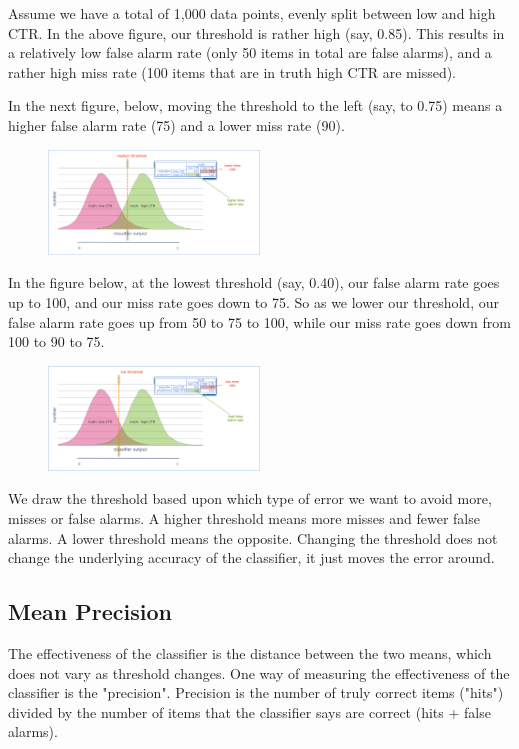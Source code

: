 Assume we have a total of 1,000 data points, evenly split between low and high CTR. In the above figure, our threshold is rather high (say, 0.85). This results in a relatively low false alarm rate (only 50 items in total are false alarms), and a rather high miss rate (100 items that are in truth high CTR are missed).

In the next figure, below, moving the threshold to the left (say, to 0.75) means a higher false alarm rate (75) and a lower miss rate (90).

\begin{figure}
\centering
\includegraphics[width=0.5\textwidth]{img/testclass/4.png}
\caption{
}
\label{Fig.1}
\end{figure}


In the figure below, at the lowest threshold (say, 0.40), our false alarm rate goes up to 100, and our miss rate goes down to 75. So as we lower our threshold, our false alarm rate goes up from 50 to 75 to 100, while our miss rate goes down from 100 to 90 to 75.

\begin{figure}
\centering
\includegraphics[width=0.5\textwidth]{img/testclass/5.png}
\caption{
}
\label{Fig.1}
\end{figure}


We draw the threshold based upon which type of error we want to avoid more, misses or false alarms. A higher threshold means more misses and fewer false alarms. A lower threshold means the opposite. Changing the threshold does not change the underlying accuracy of the classifier, it just moves the error around.

\subsection*{Mean Precision}
The effectiveness of the classifier is the distance between the two means, which does not vary as threshold changes. One way of measuring the effectiveness of the classifier is the "precision". Precision is the number of truly correct items ("hits") divided by the number of items that the classifier says are correct (hits + false alarms).


